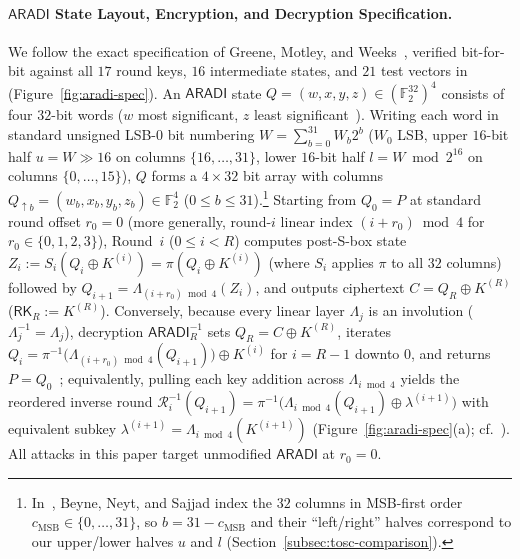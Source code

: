 \documentclass[11pt,a4paper]{article}
\theoremstyle{definition}
\theoremstyle{remark}
\newcommand{\Ftwo}{\mathbb{F}_2}
\newcommand{\ARADI}{\mathsf{ARADI}}
\begin{document}
\paragraph{$\ARADI$ State Layout, Encryption, and Decryption Specification.}
We follow the exact specification of Greene, Motley, and Weeks~\cite[Sections~3.1--3.4, pp.~3--8]{GMW24}, verified bit-for-bit against all $17$ round keys, $16$ intermediate states, and $21$ test vectors in~\cite[Figures~3.4, 4.3, and~4.4]{GMW24} (Figure~\ref{fig:aradi-spec}). An $\ARADI$ state $Q = (w, x, y, z) \in (\Ftwo^{32})^4$ consists of four $32$-bit words ($w$ most significant, $z$ least significant~\cite[p.~3]{GMW24}). Writing each word in standard unsigned LSB-0 bit numbering $W = \sum_{b=0}^{31} W_b 2^b$ ($W_0$ LSB, upper $16$-bit half $u = W \gg 16$ on columns $\{16,\dots,31\}$, lower $16$-bit half $l = W \bmod 2^{16}$ on columns $\{0,\dots,15\}$), $Q$ forms a $4 \times 32$ bit array with columns $Q_{\uparrow b} = (w_b, x_b, y_b, z_b) \in \Ftwo^4$ ($0 \le b \le 31$).\footnote{In~\cite{BNS26}, Beyne, Neyt, and Sajjad index the $32$ columns in MSB-first order $c_{\text{MSB}} \in \{0,\dots,31\}$, so $b = 31 - c_{\text{MSB}}$ and their ``left/right'' halves correspond to our upper/lower halves $u$ and $l$ (Section~\ref{subsec:tosc-comparison}).} Starting from $Q_0 = P$ at standard round offset $r_0 = 0$ (more generally, round-$i$ linear index $(i + r_0)\bmod 4$ for $r_0 \in \{0,1,2,3\}$), Round~$i$ ($0 \le i < R$) computes post-S-box state $Z_i := S_i(Q_i \oplus K^{(i)}) = \pi(Q_i \oplus K^{(i)})$ (where $S_i$ applies $\pi$ to all $32$ columns) followed by $Q_{i+1} = \Lambda_{(i+r_0)\bmod 4}(Z_i)$, and outputs ciphertext $C = Q_R \oplus K^{(R)}$ ($\mathsf{RK}_R := K^{(R)}$). Conversely, because every linear layer $\Lambda_j$ is an involution ($\Lambda_j^{-1} = \Lambda_j$), decryption $\mathsf{ARADI}_R^{-1}$ sets $Q_R = C \oplus K^{(R)}$, iterates $Q_i = \pi^{-1}\bigl(\Lambda_{(i+r_0)\bmod 4}(Q_{i+1})\bigr) \oplus K^{(i)}$ for $i = R-1$ downto $0$, and returns $P = Q_0$~\cite[Section~3.3, p.~7]{GMW24}; equivalently, pulling each key addition across $\Lambda_{i\bmod 4}$ yields the reordered inverse round $\mathcal{R}_i^{-1}(Q_{i+1}) = \pi^{-1}\bigl(\Lambda_{i\bmod 4}(Q_{i+1}) \oplus \lambda^{(i+1)}\bigr)$ with equivalent subkey $\lambda^{(i+1)} = \Lambda_{i\bmod 4}(K^{(i+1)})$ (Figure~\ref{fig:aradi-spec}(a); cf.~\cite[Figure~1]{BNS26}). All attacks in this paper target unmodified $\ARADI$ at $r_0 = 0$.
\end{document}
